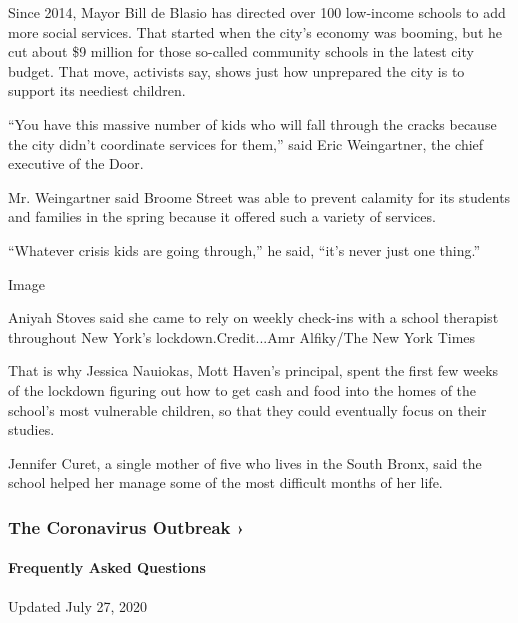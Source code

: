 Since 2014, Mayor Bill de Blasio has directed over 100 low-income
schools to add more social services. That started when the city's
economy was booming, but he cut about \$9 million for those so-called
community schools in the latest city budget. That move, activists say,
shows just how unprepared the city is to support its neediest children.

``You have this massive number of kids who will fall through the cracks
because the city didn't coordinate services for them,'' said Eric
Weingartner, the chief executive of the Door.

Mr. Weingartner said Broome Street was able to prevent calamity for its
students and families in the spring because it offered such a variety of
services.

``Whatever crisis kids are going through,'' he said, ``it's never just
one thing.''

Image

Aniyah Stoves said she came to rely on weekly check-ins with a school
therapist throughout New York's lockdown.Credit...Amr Alfiky/The New
York Times

That is why Jessica Nauiokas, Mott Haven's principal, spent the first
few weeks of the lockdown figuring out how to get cash and food into the
homes of the school's most vulnerable children, so that they could
eventually focus on their studies.

Jennifer Curet, a single mother of five who lives in the South Bronx,
said the school helped her manage some of the most difficult months of
her life.

\href{https://www.nytimes.com/news-event/coronavirus?action=click\&pgtype=Article\&state=default\&region=MAIN_CONTENT_3\&context=storylines_faq}{}

\hypertarget{the-coronavirus-outbreak-}{%
\subsubsection{The Coronavirus Outbreak
›}\label{the-coronavirus-outbreak-}}

\hypertarget{frequently-asked-questions}{%
\paragraph{Frequently Asked
Questions}\label{frequently-asked-questions}}

Updated July 27, 2020

